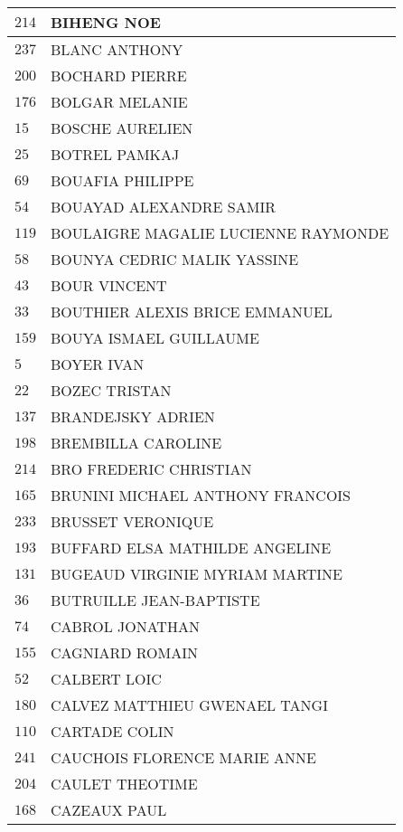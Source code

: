 \begin{xltabular}{\linewidth}{|l|X|}
    $214$ & BIHENG NOE \\
    \hline
    $237$ & BLANC ANTHONY \\
    \hline
    $200$ & BOCHARD PIERRE \\
    \hline
    $176$ & BOLGAR MELANIE \\
    \hline
    $15$ & BOSCHE AURELIEN \\
    \hline
    $25$ & BOTREL PAMKAJ \\
    \hline
    $69$ & BOUAFIA PHILIPPE \\
    \hline
    $54$ & BOUAYAD ALEXANDRE SAMIR \\
    \hline
    $119$ & BOULAIGRE MAGALIE LUCIENNE RAYMONDE \\
    \hline
    $58$ & BOUNYA CEDRIC MALIK YASSINE \\
    \hline
    $43$ & BOUR VINCENT \\
    \hline
    $33$ & BOUTHIER ALEXIS BRICE EMMANUEL \\
    \hline
    $159$ & BOUYA ISMAEL GUILLAUME \\
    \hline
    $5$ & BOYER IVAN \\
    \hline
    $22$ & BOZEC TRISTAN \\
    \hline
    $137$ & BRANDEJSKY ADRIEN \\
    \hline
    $198$ & BREMBILLA CAROLINE \\
    \hline
    $214$ & BRO FREDERIC CHRISTIAN \\
    \hline
    $165$ & BRUNINI MICHAEL ANTHONY FRANCOIS \\
    \hline
    $233$ & BRUSSET VERONIQUE \\
    \hline
    $193$ & BUFFARD ELSA MATHILDE ANGELINE \\
    \hline
    $131$ & BUGEAUD VIRGINIE MYRIAM MARTINE \\
    \hline
    $36$ & BUTRUILLE JEAN-BAPTISTE \\
    \hline
    $74$ & CABROL JONATHAN \\
    \hline
    $155$ & CAGNIARD ROMAIN \\
    \hline
    $52$ & CALBERT LOIC \\
    \hline
    $180$ & CALVEZ MATTHIEU GWENAEL TANGI \\
    \hline
    $110$ & CARTADE COLIN \\
    \hline
    $241$ & CAUCHOIS FLORENCE MARIE ANNE \\
    \hline
    $204$ & CAULET THEOTIME \\
    \hline
    $168$ & CAZEAUX PAUL \\

\end{xltabular}
